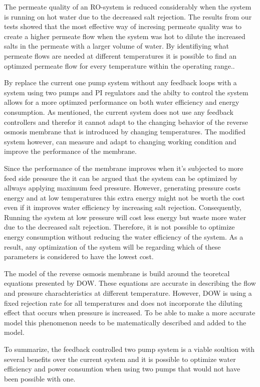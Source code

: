 
The permeate quality of an RO-system is reduced considerably when the system is running on hot water due to the decreased salt rejection. The results from our tests showed that the most effective way of incresing permeate quality was to create a higher permeate flow when the system was hot to dilute the increased salts in the permeate with a larger volume of water. By identifiying what permeate flows are needed at different temperatures it is possible to find an optimzed permeate flow for every temperature within the operating range..  

By replace the current one pump system without any feedback loops with a system using two pumps and PI regulators and the abilty to control the system allows for a more optimzed performance on both water efficiency and energy consumption. As mentioned, the current system does not use any feedback controllers and therefor it cannot adapt to the changing behavior of the reverse osmosis membrane that is introduced by changing temperatures. The modified system however, can measure and adapt to changing working condition and improve the performance of the membrane.

Since the performance of the membrane improves when it's subjected to more feed side pressure the it can be argued that the system can be optimized by allways applying maximum feed pressure. However, generating pressure costs energy and at low temperatures this extra energy might not be worth the cost even if it improves water efficiency by increasing salt rejection. Consequently, Running the system at low pressure will cost less energy but waste more water due to the decreased salt rejection. Therefore, it is not possible to optimize energy consumption without reducing the water efficiency of the system. As a result, any optimization of the system will be regarding which of these parameters is considered to have the lowest cost.

The model of the reverse osmosis membrane is build around the teoretcal equations presented by DOW. These equations are accurate in describing the flow and pressure charachteristics at different temperature. However, DOW is using a fixed rejection rate for all temperatures and does not incorporate the diluting effect that occurs when pressure is increased.  To be able to make a more accurate model this phenomenon needs to be matematically described and added to the model.

To summarize, the feedback controlled two pump system is a viable soultion with several benefits over the current system and it is possible to optimize water efficiency and power consumtion when using two pumps that would not have been possible with one.  






 


